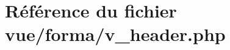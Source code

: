 \hypertarget{v__header_8php}{}\section{Référence du fichier vue/forma/v\+\_\+header.php}
\label{v__header_8php}
